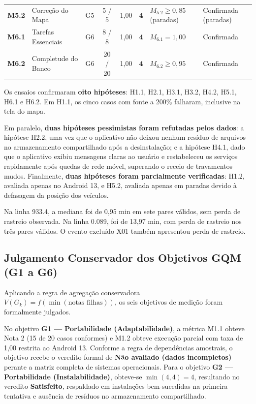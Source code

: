 \documentclass[11pt,a4paper]{article}
\begin{document}
\begin{minipage}{\textwidth}
\begin{table}[H]
\begin{tabularx}{\textwidth}{c >{\raggedright\arraybackslash}p{2.4cm} c c c c X >{\raggedright\arraybackslash}p{2.5cm}}
\textbf{M5.2} & Correção do Mapa & G5 & 5 / 5 & 1,00 & \textbf{4} & $M_{5.2} \ge 0{,}85$ (paradas) & Confirmada (paradas) \\
\textbf{M6.1} & Tarefas Essenciais & G6 & 8 / 8 & 1,00 & \textbf{4} & $M_{6.1} = 1{,}00$ & Confirmada \\
\textbf{M6.2} & Completude do Banco & G6 & 20 / 20 & 1,00 & \textbf{4} & $M_{6.2} \ge 0{,}95$ & Confirmada \\
\bottomrule
\end{tabularx}
\end{table}
\end{minipage}\par

Os ensaios confirmaram \textbf{oito hipóteses}: H1.1, H2.1, H3.1, H3.2, H4.2, H5.1, H6.1 e H6.2. Em H1.1, os cinco casos com fonte a 200\% falharam, inclusive na tela do mapa.

Em paralelo, \textbf{duas hipóteses pessimistas foram refutadas pelos dados}: a hipótese H2.2, uma vez que o aplicativo não deixou nenhum resíduo de arquivos no armazenamento compartilhado após a desinstalação; e a hipótese H4.1, dado que o aplicativo exibiu mensagens claras ao usuário e restabeleceu os serviços rapidamente após quedas de rede móvel, superando o receio de travamentos mudos. Finalmente, \textbf{duas hipóteses foram parcialmente verificadas}: H1.2, avaliada apenas no Android 13, e H5.2, avaliada apenas em paradas devido à defasagem da posição dos veículos.

Na linha 933.4, a mediana foi de 0,95 min em sete pares válidos, sem perda de rastreio observada. Na linha 0.089, foi de 13,97 min, com perda de rastreio nos três pares válidos. O evento excluído X01 também apresentou perda de rastreio.

\subsection{Julgamento Conservador dos Objetivos GQM (G1 a G6)}
\label{sec:julgamento_gqm}

Aplicando a regra de agregação conservadora $V(G_k) = f(\min(\text{notas filhas}))$, os seis objetivos de medição foram formalmente julgados.

No objetivo \textbf{G1 --- Portabilidade (Adaptabilidade)}, a métrica M1.1 obteve Nota 2 (15 de 20 casos conformes) e M1.2 obteve execução parcial com taxa de 1,00 restrita ao Android 13. Conforme a regra de dependências amostrais, o objetivo recebe o veredito formal de \textbf{Não avaliado (dados incompletos)} perante a matriz completa de sistemas operacionais. Para o objetivo \textbf{G2 --- Portabilidade (Instalabilidade)}, obteve-se $\min(4, 4) = 4$, resultando no veredito \textbf{Satisfeito}, respaldado em instalações bem-sucedidas na primeira tentativa e ausência de resíduos no armazenamento compartilhado.
\end{document}
